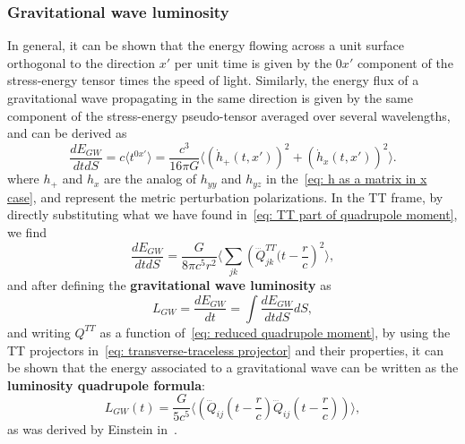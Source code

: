 \subsubsection{Gravitational wave luminosity}
In general, it can be shown that the energy flowing across a unit surface orthogonal to the direction $x'$ per unit time is given by the $0x'$ component of the stress-energy tensor times the speed of light.
Similarly, the energy flux of a gravitational wave propagating in the same direction is given by the same component of the stress-energy pseudo-tensor averaged over several wavelengths, and can be derived as
\[
    \frac{dE_{GW}}{dtdS} = c\langle t^{0x'}\rangle = \frac{c^3}{16\pi G}\langle (\dot{h}_+(t,x'))^2 + (\dot{h}_x(t,x'))^2 \rangle.
\]
where $h_+$ and $h_x$ are the analog of $h_{yy}$ and $h_{yz}$ in the~\eqref{eq: h as a matrix in x case}, and represent the metric perturbation polarizations.
In the TT frame, by directly substituting what we have found in~\eqref{eq: TT part of quadrupole moment}, we find 
\[
\frac{dE_{GW}}{dtdS} = \frac{G}{8\pi c^5 r^2}\Big\langle \sum_{jk}\left( \dddot{Q}_{jk}^{TT}(t-\frac{r}{c} \right)^2 \Big\rangle,
\]
and after defining the \textbf{gravitational wave luminosity} as
\[
    L_{GW} = \frac{dE_{GW}}{dt} = \int \frac{dE_{GW}}{dtdS}dS,
\]
and writing $Q^{TT}$ as a function of~\eqref{eq: reduced quadrupole moment}, by using the TT projectors in~\eqref{eq: transverse-traceless projector} and their properties, it can be shown that the energy associated to a gravitational wave can be written as the \textbf{luminosity quadrupole formula}:
\begin{equation}
    L_{GW}(t) = \frac{G}{5c^5}\Big\langle \left(\dddot{Q}_{ij}\left(t- \frac{r}{c}\right) \dddot{Q}_{ij}\left(t-\frac{r}{c}\right)\right) \Big\rangle,
    \label{eq: luminosity quadrupole formula}
\end{equation}
as was derived by Einstein in~\cite{Einstein_1918}.

